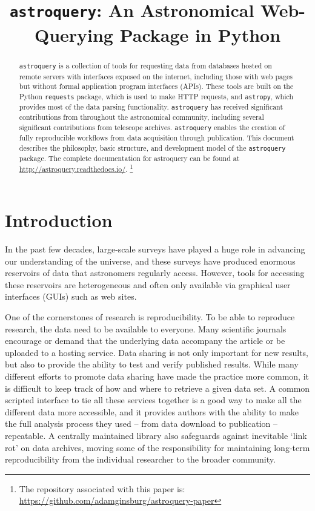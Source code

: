 \documentclass[twocolumn]{aastex62}
\newcommand{\package}[1]{\texttt{#1}\xspace}
\newcommand{\astroquery}{\package{astroquery}}
\newcommand{\astropypkg}{\package{astropy}}
\begin{document}


\title{\astroquery: An Astronomical Web-Querying Package in Python}

\begin{abstract}
\astroquery is a collection of tools for requesting data from databases hosted
on remote servers with interfaces exposed on the internet, including those with
web pages but without formal application program interfaces (APIs).  These
tools are built on the Python
\package{requests} package, which is used to make HTTP requests, and
\astropypkg, which provides most of the data parsing functionality. \astroquery
has received significant contributions from throughout the astronomical community,
including several significant contributions from telescope archives.
\astroquery enables the creation of fully reproducible workflows from data
acquisition through publication.  This document describes the philosophy, basic
structure, and development model of the \astroquery package.
The complete documentation for astroquery can be found at
\url{http://astroquery.readthedocs.io/}.
\footnote{%
The repository associated with this paper is:\\
\url{https://github.com/adamginsburg/astroquery-paper}
}
\end{abstract}


\section{Introduction}
In the past few decades, large-scale surveys have played a huge role in
advancing our understanding of the universe, and these surveys have produced
enormous reservoirs of data that astronomers regularly access.  However, tools
for accessing these reservoirs are heterogeneous and often only available via
graphical user interfaces (GUIs) such as web sites.

One of the cornerstones of research is reproducibility. To be able to reproduce
research, the data need to be available to everyone. Many scientific journals
encourage or demand that the underlying data  accompany the article or be
uploaded to a hosting service. Data sharing is not only important for new
results, but also to provide the ability to test and verify published results.
While many different efforts to promote data sharing have made the practice
more common, it is difficult to keep track of how and where to retrieve a given
data set. A common scripted interface to tie all these services together is a
good way to make all the different data more accessible, and it provides
authors with the ability to make the full analysis process they used -- from
data download to publication -- repeatable.  A centrally maintained library
also safeguards against inevitable `link rot' on data archives, moving some of
the responsibility for maintaining long-term reproducibility from the
individual researcher to the broader community.
\end{document}
